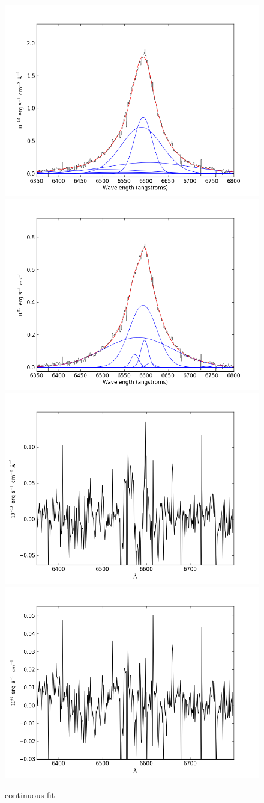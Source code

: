 \documentclass[usenatbib]{mn2e}
\begin{document}
\begin{figure}
\begin{center}
\includegraphics[width=0.46\linewidth,angle=0]{Halpha_0.png}
\vspace{5mm}
\includegraphics[width=0.49\linewidth,angle=0]{Halpha_1.png}\\
\includegraphics[width=0.46\linewidth,angle=0]{Halpha_res_0.png}
\hspace{5mm}
\includegraphics[width=0.49\linewidth,angle=0]{Halpha_res_1.png}\\
\end{center} 
\caption{continuous fit \label{fig:landscape}}   
\end{figure}
\end{document}
